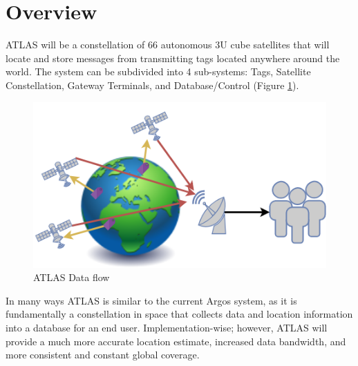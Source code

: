 \documentclass{article}
\begin{document}
\section{Overview}

ATLAS will be a constellation of 66 autonomous 3U cube satellites that will locate and store messages from transmitting tags located anywhere around the world. The system can be subdivided into 4 sub-systems: Tags, Satellite Constellation, Gateway Terminals, and Database/Control (Figure \ref{fig:sub_flow}).
\begin{figure}[H]
  \centering
  \includegraphics[width=0.8\linewidth]{figures/atlas_sub}
  \caption{ATLAS Data flow}
  \label{fig:sub_flow}
\end{figure}
In many ways ATLAS is similar to the current Argos system, as it is fundamentally a constellation in space that collects data and location information into a database for an end user. Implementation-wise; however, ATLAS will provide a much more accurate location estimate, increased data bandwidth, and more consistent and constant global coverage. 
\end{document}
